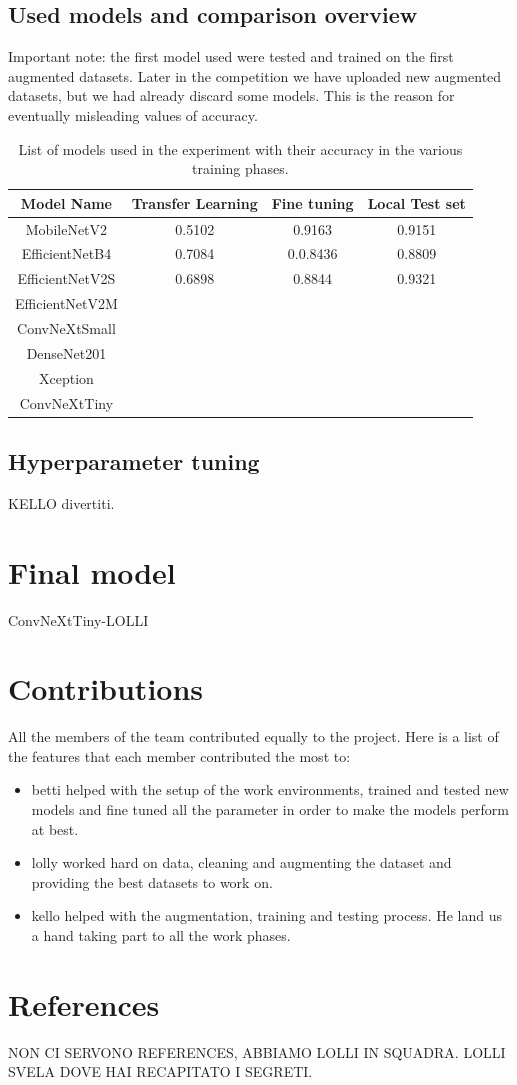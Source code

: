 \documentclass[11pt]{article}
\begin{document}
\subsection{Used models and comparison overview}
Important note: the first model used were tested and trained on the first augmented datasets. Later in the competition we have uploaded new augmented datasets, but we had already discard some models. This is the reason for eventually misleading values of accuracy.
\begin{table}[h!]
\centering

\begin{tabular}{|c|c|c|c|}
\hline
\textbf{Model Name} & \textbf{Transfer Learning} & \textbf{Fine tuning}& \textbf{Local Test set} \\
\hline
MobileNetV2         & 0.5102 & 0.9163 & 0.9151 \\ \hline
EfficientNetB4      & 0.7084 & 0.0.8436 & 0.8809 \\ \hline
EfficientNetV2S     & 0.6898 & 0.8844 & 0.9321 \\ \hline
EfficientNetV2M     &  &  & \\ \hline
ConvNeXtSmall       &  &  & \\ \hline
DenseNet201         &  &  & \\ \hline
Xception            &  &  & \\ \hline
ConvNeXtTiny        &  &  & \\ \hline
\end{tabular}
\caption{List of models used in the experiment with their accuracy in the various training phases.}
\end{table}

\subsection{Hyperparameter tuning}
\label{hyperparametertuning}
KELLO divertiti.


\section{Final model}
ConvNeXtTiny-LOLLI


\section{Contributions}

All the members of the team contributed equally to the project. Here is a list of the features that each member contributed the most to:
\begin{itemize}
    \item betti helped with the setup of the work environments, trained and tested new models and fine tuned all the parameter in order to make the models perform at best.
    \item lolly worked hard on data, cleaning and augmenting the dataset and providing the best datasets to work on.
    \item kello helped with the augmentation, training and testing process. He land us a hand taking part to all the work phases.
\end{itemize}




\section{References}
NON CI SERVONO REFERENCES, ABBIAMO LOLLI IN SQUADRA.
LOLLI SVELA DOVE HAI RECAPITATO I SEGRETI.
\end{document}

